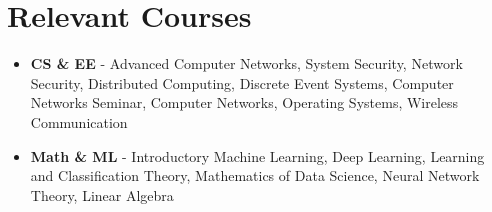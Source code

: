 \section{Relevant Courses}
\begin{itemize}
\item \textbf{CS \& EE} - Advanced Computer Networks, System Security, Network Security, Distributed Computing, Discrete Event Systems, Computer Networks Seminar, Computer Networks, Operating Systems, Wireless Communication
\item \textbf{Math \& ML} - Introductory Machine Learning, Deep Learning, Learning and Classification Theory, Mathematics of Data Science, Neural Network Theory, Linear Algebra
\end{itemize}